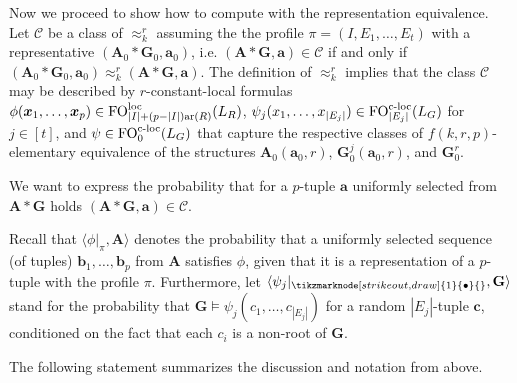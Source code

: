 \documentclass[11pt]{article}
\theoremstyle{plain}
\theoremstyle{definition}
\theoremstyle{remark}
\DeclareMathOperator\aritysym{ar}
\newcommand{\arity}[1]{{\aritysym({#1})}}
\DeclareMathOperator\FO{FO}
\newcommand{\FOloc}[1]{\FO_{#1}^\textnormal{loc}}
\newcommand{\FOcloc}[1]{\FO_{#1}^{\textnormal{c-loc}}}
\newcommand{\stonepar}[2]{\langle #1, #2 \rangle}
\newcommand{\str}[1]{\mathbf{#1}}
\newcommand{\tpl}[1]{{\bm{#1}}}
\newcommand{\nonroot}{\tikzmarknode[strike out,draw]{1}{\bullet}}
\begin{document}
Now we proceed to show how to compute with the representation equivalence.
Let $\mathcal{C}$ be a class of $\approx_k^r$ assuming the the profile $\pi = (I,E_1, \dots, E_t)$ with a representative $(\str{A}_0*\str{G}_0, \tpl{a}_0)$, i.e. $(\str{A} * \str{G}, \tpl{a}) \in \mathcal{C}$ if and only if $(\str{A}_0 * \str{G}_0, \tpl{a}_0) \approx_k^r (\str{A} * \str{G}, \tpl{a})$.
The definition of $\approx_k^r$ implies that the class $\mathcal{C}$ may be described by $r$-constant-local formulas $\phi(\tpl{x}_1, \dots, \tpl{x}_p) \in \FOloc{|I|+(p-|I|)\arity{R}}(L_R)$, $\psi_j(x_1, \dots, x_{|E_j|}) \in \FOcloc{|E_j|}(L_G)$ for $j \in [t]$, and $\psi \in \FOcloc{0}(L_G)$ that capture the respective classes of $f(k,r,p)$-elementary equivalence of the structures $\str{A}_0(\tpl{a}_0, r)$, $\str{G}_0^j(\tpl{a}_0, r)$, and $\str{G}^r_0$.


We want to express the probability that for a $p$-tuple $\tpl{a}$ uniformly selected from $\str{A}*\str{G}$ holds $(\str{A}*\str{G}, \tpl{a}) \in \mathcal{C}$.

Recall that $\stonepar{\phi|_\pi}{\str{A}}$ denotes the probability that a uniformly selected sequence (of tuples) $\tpl{b}_1, \dots, \tpl{b}_p$ from $\str{A}$ satisfies $\phi$, given that it is a representation of a $p$-tuple with the profile $\pi$.
Furthermore, let $\stonepar{\psi_j|_{\nonroot{}}}{\str{G}}$ stand for the probability that $\str{G} \models \psi_j(c_1, \dots, c_{|E_j|})$ for a random $|E_j|$-tuple $\tpl{c}$, conditioned on the fact that each $c_i$ is a non-root of $\str{G}$.

The following statement summarizes the discussion and notation from above.
\end{document}
